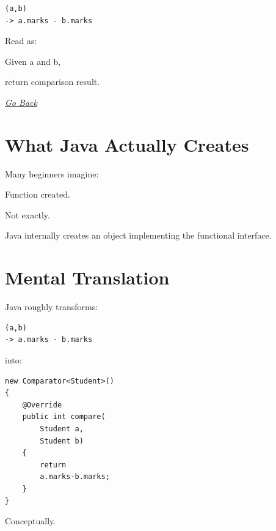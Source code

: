 \documentclass[11pt,a4paper]{book}
\begin{document}
\begin{verbatim} 
(a,b)
-> a.marks - b.marks
\end{verbatim}


Read as:


Given a and b,

return comparison result.

\hyperref[sec:lambda_ref]{\emph{Go Back}}

\section{What Java Actually Creates}

Many beginners imagine:


Function created.


Not exactly.


Java internally creates
an object implementing
the functional interface.


\section{Mental Translation}

Java roughly transforms:

\begin{verbatim} 
(a,b)
-> a.marks - b.marks
\end{verbatim}

into:

\begin{verbatim} 
new Comparator<Student>()
{
    @Override
    public int compare(
        Student a,
        Student b)
    {
        return
        a.marks-b.marks;
    }
}
\end{verbatim}


Conceptually.
\end{document}
